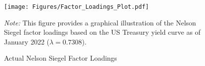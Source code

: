 





\begin{figure}[t]
    \centering
    \texttt{[image: Figures/Factor\_Loadings\_Plot.pdf]}
    \caption{Actual Nelson Siegel Factor Loadings}
    \label{fig:factor_loadings}

    \begin{minipage}{.7\linewidth}
    \footnotesize
    \medskip
    \emph{Note:} This figure provides a graphical illustration of the Nelson Siegel factor loadings based on the US Treasury yield curve as of January 2022 ($\lambda = 0.7308$).
    \end{minipage}
    
\end{figure}




